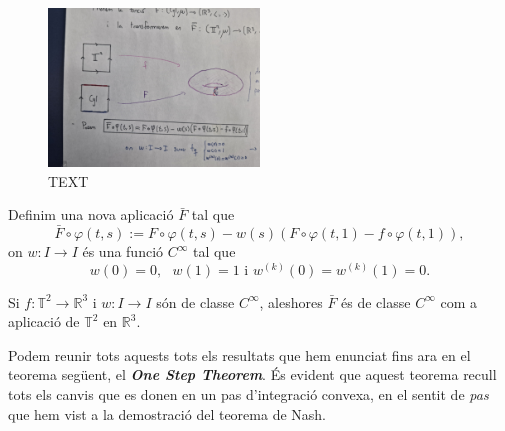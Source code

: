 \begin{figure}[htbp]
    \centering
    \includegraphics[width=0.5\textwidth]{Fotos/NOVENA.jpg}
    \caption{{\color{blue}TEXT}}
    \label{fig:novena_foto}
\end{figure}

Definim una nova aplicació $\bar F$ tal que
\begin{equation}
    \label{eq:def_barF}
    \bar F\circ\varphi(t,s) := F\circ\varphi(t,s) - w(s)(F\circ\varphi(t,1)-f\circ\varphi(t,1)),
\end{equation}
on $w:I\to I$ és una funció $C^\infty$ tal que 
\begin{equation*}
    w(0)=0, \text{ } w(1)=1 \text{ i } w^{(k)}(0)=w^{(k)}(1)=0.
\end{equation*}
\begin{lema}
    \label{lema:lema8}
    Si $f:\mathbb T^2\to\mathbb R^3$ i $w:I\to I$ són de classe $C^\infty$, aleshores $\bar F$ és de classe $C^\infty$ com a aplicació de $\mathbb T^2$ en $\mathbb R^3$.
\end{lema}
Podem reunir tots aquests tots els resultats que hem enunciat fins ara en el teorema següent, el \textbf{\textit{One Step Theorem}}. És evident que aquest teorema recull tots els canvis que es donen en un pas d'integració convexa, en el sentit de \textit{pas} que hem vist a la demostració del teorema de Nash.
